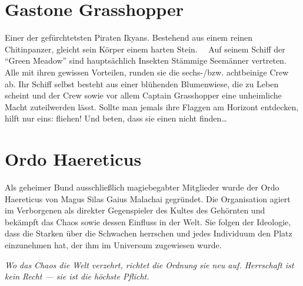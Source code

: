 \documentclass{book}
\begin{document}
\section{Gastone Grasshopper}
Einer der gefürchtetsten Piraten Ikyans. Bestehend aus einem reinen Chitinpanzer, gleicht sein Körper einem harten Stein.  
Auf seinem Schiff der “Green Meadow” sind hauptsächlich Insekten Stämmige Seemänner vertreten. Alle mit ihren gewissen Vorteilen, runden sie die sechs-/bzw. achtbeinige Crew ab.
Ihr Schiff selbst besteht aus einer blühenden Blumenwiese, die zu Leben scheint und der Crew sowie vor allem Captain Grasshopper eine unheimliche Macht zuteilwerden lässt.
Sollte man jemals ihre Flaggen am Horizont entdecken, hilft nur eins: fliehen! Und beten, dass sie einen nicht finden\dots

\section{Ordo Haereticus}
Als geheimer Bund ausschließlich magiebegabter Mitglieder wurde der Ordo Haereticus von Magus Silas Gaius Malachai gegründet. Die Organisation agiert im Verborgenen als direkter Gegenspieler des Kultes des Gehörnten und bekämpft das Chaos sowie dessen Einfluss in der Welt. Sie folgen der Ideologie, dass die Starken über die Schwachen herrschen und jedes Individuum den Platz einzunehmen hat, der ihm im Universum zugewiesen wurde.
\begin{flushright}{\it Wo das Chaos die Welt verzehrt, richtet die Ordnung sie neu auf. Herrschaft ist kein Recht — sie ist die höchste Pflicht.}\end{flushright}
\end{document}
